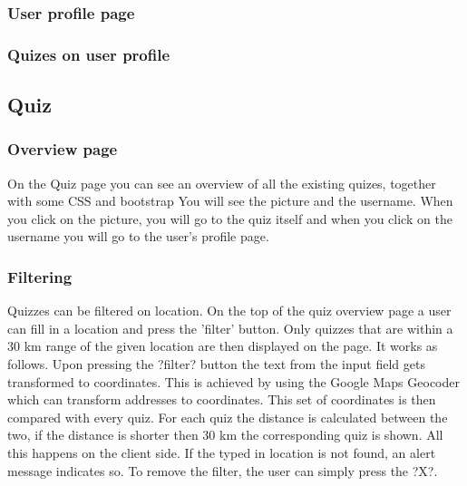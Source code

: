 \documentclass[11pt, oneside]{article}   	%
\begin{document}
\subsubsection{User profile page}

\subsubsection{Quizes on user profile}


\subsection{Quiz}
\subsubsection{ Overview page}
On the Quiz page you can see an overview of all the existing quizes, together with some CSS and bootstrap You will see the picture and the username. When you click on the picture, you will go to the quiz itself and when you click on the username you will go to the user's profile page. 

\subsubsection{Filtering}
Quizzes can be filtered on location. On the top of the quiz overview page a user can fill in a location and press the 'filter' button. Only quizzes that are within a 30 km range of the given location are then displayed on the page.
It works as follows. Upon pressing the ?filter? button the text from the input field gets transformed to coordinates. This is achieved by using the Google Maps Geocoder which can transform addresses to coordinates. This set of coordinates is then compared with every quiz. For each quiz the distance is calculated between the two, if the distance is shorter then 30 km the corresponding quiz is shown. All this happens on the client side.
If the typed in location is not found, an alert message indicates so. To remove the filter, the user can simply press the ?X?.
\end{document}
